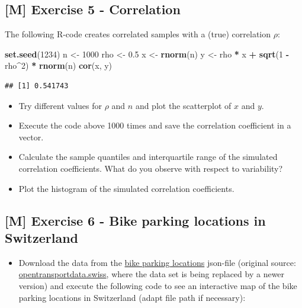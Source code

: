 \documentclass[
]{book}
\newenvironment{Shaded}{\begin{snugshade}}{\end{snugshade}}
\newcommand{\DecValTok}[1]{\textcolor[rgb]{0.00,0.00,0.81}{#1}}
\newcommand{\FloatTok}[1]{\textcolor[rgb]{0.00,0.00,0.81}{#1}}
\newcommand{\FunctionTok}[1]{\textcolor[rgb]{0.13,0.29,0.53}{\textbf{#1}}}
\newcommand{\NormalTok}[1]{#1}
\newcommand{\OtherTok}[1]{\textcolor[rgb]{0.56,0.35,0.01}{#1}}
\newcommand{\SpecialCharTok}[1]{\textcolor[rgb]{0.81,0.36,0.00}{\textbf{#1}}}
\providecommand{\tightlist}{%
  \setlength{\itemsep}{0pt}\setlength{\parskip}{0pt}}
\begin{document}
\subsection{{[}M{]} Exercise 5 - Correlation}\label{exercise5_descriptive_stats}

The following R-code creates correlated samples with a (true) correlation \(\rho\):

\begin{Shaded}
\begin{Highlighting}[]
\FunctionTok{set.seed}\NormalTok{(}\DecValTok{1234}\NormalTok{)}
\NormalTok{n }\OtherTok{\textless{}{-}} \DecValTok{1000}
\NormalTok{rho }\OtherTok{\textless{}{-}} \FloatTok{0.5}
\NormalTok{x }\OtherTok{\textless{}{-}} \FunctionTok{rnorm}\NormalTok{(n)}
\NormalTok{y }\OtherTok{\textless{}{-}}\NormalTok{ rho }\SpecialCharTok{*}\NormalTok{ x }\SpecialCharTok{+} \FunctionTok{sqrt}\NormalTok{(}\DecValTok{1} \SpecialCharTok{{-}}\NormalTok{ rho}\SpecialCharTok{\^{}}\DecValTok{2}\NormalTok{) }\SpecialCharTok{*} \FunctionTok{rnorm}\NormalTok{(n)}
\FunctionTok{cor}\NormalTok{(x, y)}
\end{Highlighting}
\end{Shaded}

\begin{verbatim}
## [1] 0.541743
\end{verbatim}

\begin{itemize}
\tightlist
\item
  Try different values for \(\rho\) and \(n\) and plot the scatterplot of \(x\) and \(y\).
\item
  Execute the code above 1000 times and save the correlation coefficient in a vector.
\item
  Calculate the sample quantiles and interquartile range of the simulated correlation coefficients.
  What do you observe with respect to variability?
\item
  Plot the histogram of the simulated correlation coefficients.
\end{itemize}

\subsection{{[}M{]} Exercise 6 - Bike parking locations in Switzerland}\label{m-exercise-6---bike-parking-locations-in-switzerland}

\begin{itemize}
\tightlist
\item
  Download the data from the
  \href{https://github.com/jdegenfellner/Script_QM1_ZHAW/raw/main/DATA/bike_parking.json}{bike parking locations} json-file
  (original source: \href{https://opentransportdata.swiss/en/cookbook/road-traffic-cookbook/bike-parking/}{opentransportdata.swiss}, where the data set is being replaced by a newer version)
  and execute the following code to see an interactive map of the bike parking locations in
  Switzerland (adapt file path if necessary):
\end{itemize}
\end{document}
